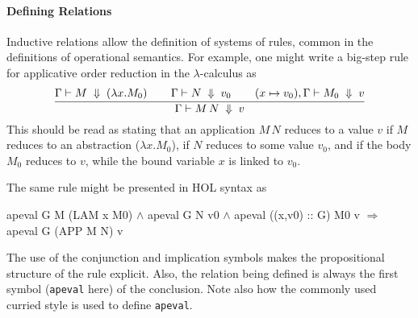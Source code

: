 \documentclass[11pt]{article}
\begin{document}
\paragraph{Defining Relations}
Inductive relations allow the definition of systems of rules, common
in the definitions of operational semantics.  For example, one might
write a big-step rule for applicative order reduction in the
$\lambda$-calculus as
\[
\infer{\Gamma \vdash M\,N\;\Downarrow \;v}{\Gamma \vdash M \;\Downarrow\; (\lambda x. M_0) \;\;&
  \;\;\Gamma \vdash N \;\Downarrow\;v_0\;\; & \;\;(x\mapsto v_0),\Gamma \vdash M_0 \;\Downarrow\; v}
\]
This should be read as stating that an application $M\,N$ reduces to a
value $v$ if $M$ reduces to an abstraction ($\lambda x. M_0$), if $N$
reduces to some value $v_0$, and if the body $M_0$ reduces to $v$,
while the bound variable $x$ is linked to $v_0$.

The same rule might be presented in HOL syntax as
\begin{stdrule}
     apeval G M (LAM x M0) \(\land\)
     apeval G N v0 \(\land\)
     apeval ((x,v0) :: G) M0 v
   \(\Rightarrow\)
     apeval G (APP M N) v
\end{stdrule}
The use of the conjunction and implication symbols makes the
propositional structure of the rule explicit.  Also, the relation
being defined is always the first symbol (\texttt{apeval} here) of the
conclusion.  Note also how the commonly used curried style is used to
define \texttt{apeval}.
\end{document}
